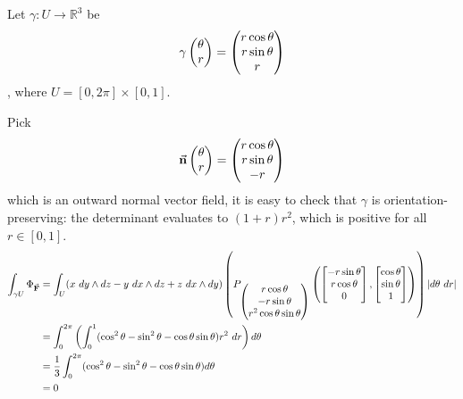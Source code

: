 \documentclass{homework}
\begin{document}
\begin{problem}{11}
  Let $\gamma: U \to \mathbb{R}^3$ be
  $$\gamma \begin{pmatrix}\theta \\ r\end{pmatrix} = \begin{pmatrix}r\cos\theta \\ r\sin\theta \\ r\end{pmatrix}$$
  , where $U = [0, 2\pi] \times [0, 1]$.
  
  Pick
  $$\vec{\mathbf{n}} \begin{pmatrix}\theta \\ r\end{pmatrix} = \begin{pmatrix}r\cos\theta \\ r\sin\theta \\ -r\end{pmatrix}$$
  which is an outward normal vector field, it is easy to check that $\gamma$ is
  orientation-preserving: the determinant evaluates to $(1+r)r^2$, which is
  positive for all $r \in [0, 1]$.
  \begin{align*}
    \int_{\gamma{U}} \Phi_{\bvec{F}} &=
    \int_U (x\ dy \land dz - y\ dx \land dz + z\ dx \land dy) \left(
      P_{\pmat{r\cos\theta \\ -r\sin\theta \\ r^2\cos\theta\sin\theta}}
        \left(
          \bmat{-r\sin\theta \\ r\cos\theta \\ 0},
          \bmat{  \cos\theta \\ \sin\theta  \\ 1}
        \right)
      \right) |d\theta\ dr| \\ &=
    \int_0^{2\pi} \left(
      \int_0^1 (\cos^2\theta - \sin^2\theta - \cos\theta\sin\theta)r^2\ dr
    \right) d\theta \\ &=
    \dfrac{1}{3} \int_0^{2\pi}
      (\cos^2\theta - \sin^2\theta - \cos\theta\sin\theta) d\theta \\ &=
    0
  \end{align*}
\end{problem}
\end{document}
